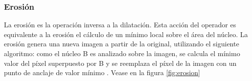 \subsubsection{Erosión}
La erosión es la operación inversa a la dilatación. Esta acción del operador es equivalente a la erosión el cálculo de un mínimo local sobre el área del núcleo. La erosión genera una nueva imagen a partir de la original, utilizando el siguiente algoritmo: como el
núcleo B es analizado sobre la imagen, se calcula el mínimo valor del píxel superpuesto por B y se reemplaza el píxel de la imagen con un punto de anclaje de valor mínimo \cite{BookOpenCv}. 
Vease en la figura \ref{fig:erosion}

